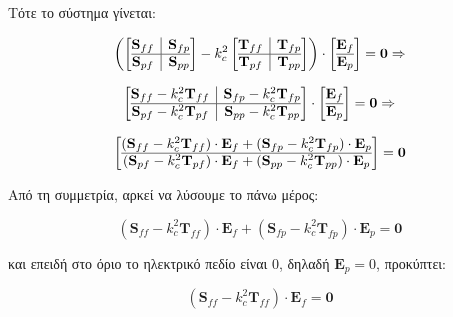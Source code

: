 \documentclass[10pt, letterpaper]{article}
\begin{document}
Τότε το σύστημα γίνεται:

\[ \left(
  \left[ \begin{array}{@{}c|c@{}}
    \mathbf{S}_{ff} & \mathbf{S}_{fp} \\
    \hline
    \mathbf{S}_{pf} & \mathbf{S}_{pp}
    \end{array} \right] - k_c^2 
    \left[ \begin{array}{@{}c|c@{}}
      \mathbf{T}_{ff} & \mathbf{T}_{fp} \\
      \hline
      \mathbf{T}_{pf} & \mathbf{T}_{pp}
      \end{array} \right]
  \right)
  \cdot \left[ \begin{array}{@{}c@{}}
    \mathbf{E}_f \\
    \hline
    \mathbf{E}_p
    \end{array} \right] = \mathbf{0}    \Rightarrow
\]

\[
  \left[ \begin{array}{@{}c|c@{}}
    \mathbf{S}_{ff} - k_c^2 \mathbf{T}_{ff} & \mathbf{S}_{fp} - k_c^2 \mathbf{T}_{fp} \\
    \hline
    \mathbf{S}_{pf} - k_c^2 \mathbf{T}_{pf} & \mathbf{S}_{pp} - k_c^2 \mathbf{T}_{pp}
    \end{array} \right]
\cdot \left[ \begin{array}{@{}c@{}}
  \mathbf{E}_f \\
  \hline
  \mathbf{E}_p
  \end{array} \right] = \mathbf{0}  \Rightarrow
\]

\[
  \left[ \begin{array}{@{}c@{}}
    (\mathbf{S}_{ff} - k_c^2 \mathbf{T}_{ff}) \cdot \mathbf{E}_f + (\mathbf{S}_{fp} - k_c^2 \mathbf{T}_{fp}) \cdot \mathbf{E}_p\\
    \hline
    (\mathbf{S}_{pf} - k_c^2 \mathbf{T}_{pf}) \cdot \mathbf{E}_f + (\mathbf{S}_{pp} - k_c^2 \mathbf{T}_{pp}) \cdot \mathbf{E}_p
    \end{array} \right] = \mathbf{0}  
\]
 
Από τη συμμετρία, αρκεί να λύσουμε το πάνω μέρος:

\[(\mathbf{S}_{ff} - k_c^2 \mathbf{T}_{ff}) \cdot \mathbf{E}_f + (\mathbf{S}_{fp} - k_c^2 \mathbf{T}_{fp}) \cdot \mathbf{E}_p = \mathbf{0}\]


και επειδή στο όριο το ηλεκτρικό πεδίο είναι 0, δηλαδή $\mathbf{E}_p = 0$, προκύπτει:

\begin{equation} \label{eq:eigen_system}
  (\mathbf{S}_{ff} - k_c^2 \mathbf{T}_{ff}) \cdot \mathbf{E}_f = \mathbf{0}
\end{equation}
\end{document}
